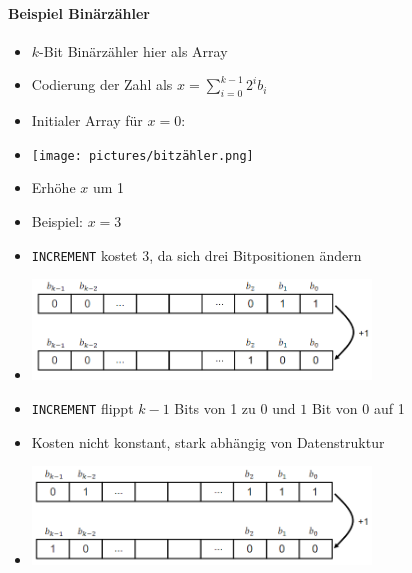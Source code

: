 \documentclass[
    ngerman,
    color=3b,
    dark_mode,
    load_common, %
    summary,
    boxarc,
]{tuda_summary}
\begin{document}
\paragraph{Beispiel Binärzähler}
\begin{description}[leftmargin=6cm,itemsep=.8em]
    \item [Eigenschaften]
          \begin{itemize}
              \item $k$-Bit Binärzähler hier als Array
              \item Codierung der Zahl als $x=\sum^{k-1}_{i=0}2^i b_i$
              \item Initialer Array für $x = 0$:
              \item[]\texttt{[image: pictures/bitzähler.png]}
          \end{itemize}
    \item [Inkrementieren eines Binärzählers]
          \begin{itemize}
              \item Erhöhe $x$ um 1
              \item Beispiel: $x=3$
              \item \texttt{INCREMENT} kostet 3, da sich drei Bitpositionen ändern
              \item[] \includegraphics[width=9cm]{pictures/increment.PNG}
          \end{itemize}
          \vspace*{-.2cm}
    \item [Teuerste INCREMENT-Operation]
          \begin{itemize}
              \item \texttt{INCREMENT} flippt $k-1$ Bits von 1 zu 0 und $1$ Bit von 0 auf 1
              \item Kosten nicht konstant, stark abhängig von Datenstruktur
              \item[] \includegraphics[width=9cm]{pictures/incrementEXP.PNG}

\end{itemize}
\end{description}
\end{document}
